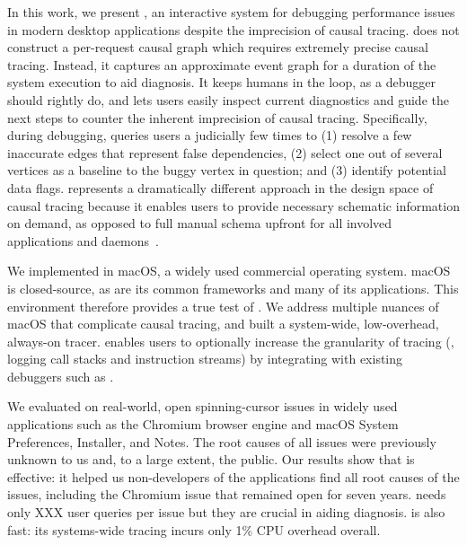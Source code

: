 In this work, we present \xxx, an interactive system for debugging
performance issues in modern desktop applications despite the imprecision
of causal tracing. \xxx does not construct a per-request causal graph
which requires extremely precise causal tracing.  Instead, it captures an
approximate event graph for a duration of the system execution to aid
diagnosis.  It keeps humans in the loop, as a debugger should rightly do,
and lets users easily inspect current diagnostics and guide the next steps
to counter the inherent imprecision of causal tracing.  Specifically,
during debugging, \xxx queries users a judicially few times to (1) resolve
a few inaccurate edges that represent false dependencies, (2) select one
out of several vertices as a baseline to the buggy vertex in question; and
(3) identify potential data flags.  \xxx represents a dramatically
different approach in the design space of causal tracing because it
enables users to provide necessary schematic information on demand, as
opposed to full manual schema upfront for all involved applications and
daemons~\cite{barham2004using}.

We implemented \xxx in macOS, a widely used commercial operating
system. macOS is closed-source, as are its common frameworks and many of
its applications.  This environment therefore provides a true test of
\xxx.  We address multiple nuances of macOS that complicate causal
tracing, and built a system-wide, low-overhead, always-on tracer.  \xxx
enables users to optionally increase the granularity of tracing (\eg,
logging call stacks and instruction streams) by integrating with existing
debuggers such as .

We evaluated \xxx on \nbug real-world, open spinning-cursor issues in
widely used applications such as the Chromium browser engine and macOS
System Preferences, Installer, and Notes.  The root causes of all \nbug
issues were previously unknown to us and, to a large extent, the
public. Our results show that \xxx is effective: it helped us
non-developers of the applications find all root causes of the issues,
including the Chromium issue that remained open for seven years.  \xxx
needs only XXX user queries per issue but they are crucial in aiding
diagnosis. \xxx is also fast: its systems-wide tracing incurs only 1\% CPU
overhead overall.


